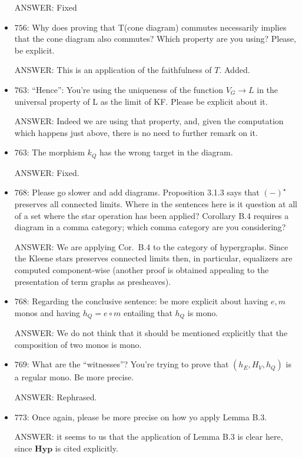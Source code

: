 \documentclass[english,11pt,a4paper]{article}
\begin{document}
\begin{itemize}
ANSWER: Fixed

\item $756$: Why does proving that T(cone diagram) commutes necessarily implies that the cone diagram also commutes? Which property are you using? Please, be explicit.

ANSWER: This is  an application of the faithfulness of $T$. Added.

\item $763$: ``Hence'': You're using the uniqueness of the function $V_G \to L$ in the universal property of L as the limit of KF. Please be explicit about it.

ANSWER: Indeed we are using that property, and, given the computation which happens just above, there is no need to further remark on it.

\item $763$: The morphism $k_Q$ has the wrong target in the diagram.

ANSWER: Fixed.

\item $768$: Please go slower and add diagrams. Proposition 3.1.3 says that $(-)^\star$ preserves all connected limits. Where in the sentences here is it question at all of a set where the star operation has been applied? Corollary B.4 requires a diagram in a comma category; which comma category are you considering?

ANSWER:  We are applying Cor.~B.4 to the category of hypergraphs. Since the Kleene stars preserves connected limits then, in particular, equalizers are computed component-wise (another proof is obtained appealing to the presentation of term graphs as presheaves). 

\item $768$: Regarding the conclusive sentence: be more explicit about having $e,m$ monos and having $h_Q=e\circ m$ entailing that $h_Q$ is mono.

ANSWER: We do not think that it should be mentioned explicitly that the composition of two monos is mono.

\item $769$: What are the ``witnesses''? You're trying to prove that $(h_E,H_V,h_Q)$ is a regular mono. Be more precise.

ANSWER: Rephrased.

\item $773$: Once again, please be more precise on how yo apply Lemma B.3.

ANSWER: it seems to us that the application of Lemma B.3 is clear here, since $\mathbf{Hyp}$ is cited explicitly.


\end{itemize}
\end{document}
